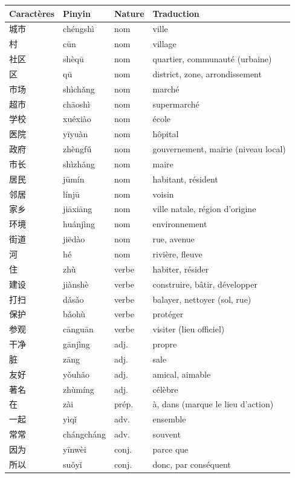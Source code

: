 \documentclass[11pt]{article}
\begin{document}
\begin{definition}
\begin{center}
\begin{tabularx}{\linewidth}{|X|X|X|X|}
\hline
\rowcolor{popblueL} \textbf{Caractères} & \textbf{Pinyin} & \textbf{Nature} & \textbf{Traduction} \\ \hline
城市 & chéngshì & nom & ville \\ \hline
村 & cūn & nom & village \\ \hline
社区 & shèqū & nom & quartier, communauté (urbaine) \\ \hline
区 & qū & nom & district, zone, arrondissement \\ \hline
市场 & shìchǎng & nom & marché \\ \hline
超市 & chāoshì & nom & supermarché \\ \hline
学校 & xuéxiào & nom & école \\ \hline
医院 & yīyuàn & nom & hôpital \\ \hline
政府 & zhèngfǔ & nom & gouvernement, mairie (niveau local) \\ \hline
市长 & shìzhǎng & nom & maire \\ \hline
居民 & jūmín & nom & habitant, résident \\ \hline
邻居 & línjū & nom & voisin \\ \hline
家乡 & jiāxiāng & nom & ville natale, région d'origine \\ \hline
环境 & huánjìng & nom & environnement \\ \hline
街道 & jiēdào & nom & rue, avenue \\ \hline
河 & hé & nom & rivière, fleuve \\ \hline
住 & zhù & verbe & habiter, résider \\ \hline
建设 & jiànshè & verbe & construire, bâtir, développer \\ \hline
打扫 & dǎsǎo & verbe & balayer, nettoyer (sol, rue) \\ \hline
保护 & bǎohù & verbe & protéger \\ \hline
参观 & cānguān & verbe & visiter (lieu officiel) \\ \hline
干净 & gānjìng & adj. & propre \\ \hline
脏 & zāng & adj. & sale \\ \hline
友好 & yǒuhǎo & adj. & amical, aimable \\ \hline
著名 & zhùmíng & adj. & célèbre \\ \hline
在 & zài & prép. & à, dans (marque le lieu d'action) \\ \hline
一起 & yìqǐ & adv. & ensemble \\ \hline
常常 & chángcháng & adv. & souvent \\ \hline
因为 & yīnwèi & conj. & parce que \\ \hline
所以 & suǒyǐ & conj. & donc, par conséquent \\ \hline
\end{tabularx}
\end{center}
\end{definition}
\end{document}
